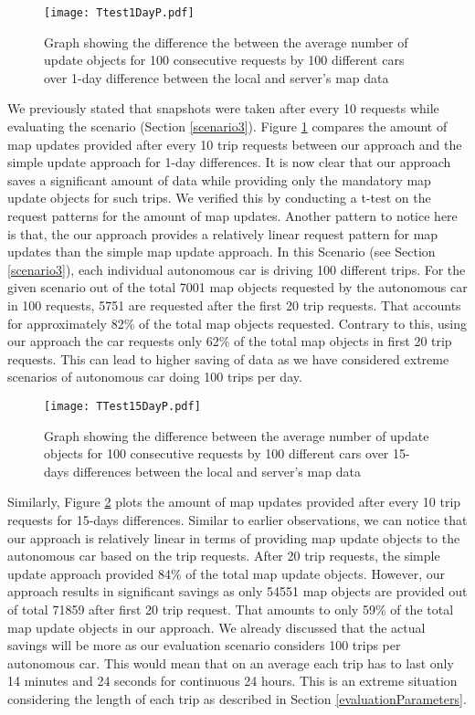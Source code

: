 \begin{figure}
\centering
\texttt{[image: Ttest1DayP.pdf]}
\caption{Graph showing the difference the between the average number of update objects for 100 consecutive requests by 100 different cars over 1-day difference between the local and server's map data}
\label{fg:ber1d100}
\end{figure}

We previously stated that snapshots were taken after every 10 requests while evaluating the scenario (Section \ref{scenario3}). Figure \ref{fg:ber1d100} compares the amount of map updates provided after every 10 trip requests between our approach and the simple update approach for 1-day differences. It is now clear that our approach saves a significant amount of data while providing only the mandatory map update objects for such trips. We verified this by conducting a t-test on the request patterns for the amount of map updates. Another pattern to notice here is that, the our approach provides a relatively linear request pattern for map updates than the simple map update approach. In this Scenario (see Section \ref{scenario3}), each individual autonomous car is driving 100 different trips. For the given scenario out of the total 7001 map objects requested by the autonomous car in 100 requests, 5751 are requested after the first 20 trip requests. That accounts for approximately 82\% of the total map objects requested. Contrary to this, using our approach the car requests only 62\% of the total map objects in first 20 trip requests. This can lead to higher saving of data as we have considered extreme scenarios of autonomous car doing 100 trips per day. \\

\begin{figure}
\centering
\texttt{[image: TTest15DayP.pdf]}
\caption{Graph showing the difference between the average number of update objects for 100 consecutive requests by 100 different cars over 15-days differences between the local and server's map data }
\label{fg:ber15d100}
\end{figure}

Similarly, Figure \ref{fg:ber15d100} plots the amount of map updates provided after every 10 trip requests for 15-days differences. Similar to earlier observations, we can notice that our approach is relatively linear in terms of providing map update objects to the autonomous car based on the trip requests. After 20 trip requests, the simple update approach provided 84\% of the total map update objects. However, our approach results in significant savings as only 54551 map objects are provided out of total 71859 after first 20 trip request. That amounts to only 59\% of the total map update objects in our approach. We already discussed that the actual savings will be more as our evaluation scenario considers 100 trips per autonomous car. This would mean that on an average each trip has to last only 14 minutes and 24 seconds for continuous 24 hours. This is an extreme situation considering the length of each trip as described in Section \ref{evaluationParameters}.  \\


